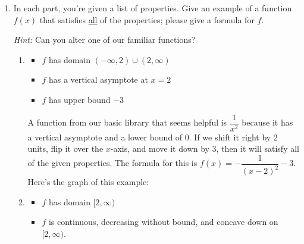 \documentclass{article}
\theoremstyle{theorem}
\begin{document}
\begin{enumerate}
\item {} 

  In each part, you're given a list of properties. Give an example of a function $f(x)$ that satisfies \uline{all} of the properties; please give a formula for $f$. 

  \emph{Hint:} Can you alter one of our familiar functions? 

  \begin{enumerate}

  \item
    \begin{problem}[\vfill]
      \begin{itemize}[nosep]
      \item $f$ has domain $(-\infty, 2) \cup (2, \infty)$
      \item $f$ has a vertical asymptote at $x = 2$
      \item $f$ has upper bound $-3$
      \end{itemize}
    \end{problem}

    \begin{solution}
      A function from our basic library that seems helpful is $\dfrac{1}{x^2}$ because it has a vertical asymptote and a lower bound of 0. If we shift it right by 2 units, flip it over the $x$-axis, and move it down by $3$, then it will satisfy all of the given properties. The formula for this is $\boxed{f(x) = - \dfrac{1}{(x - 2)^2} - 3}$. Here's the graph of this example:
      \begin{center}
      \end{center}
    \end{solution}

  \item
    \begin{problem}[\vfill\newpage]
      \begin{itemize}[nosep]
      \item $f$ has domain $[2, \infty)$
      \item $f$ is continuous, decreasing without bound, and concave down on $[2, \infty)$.
      \end{itemize}
    \end{problem}


\end{enumerate}
\end{enumerate}
\end{document}
